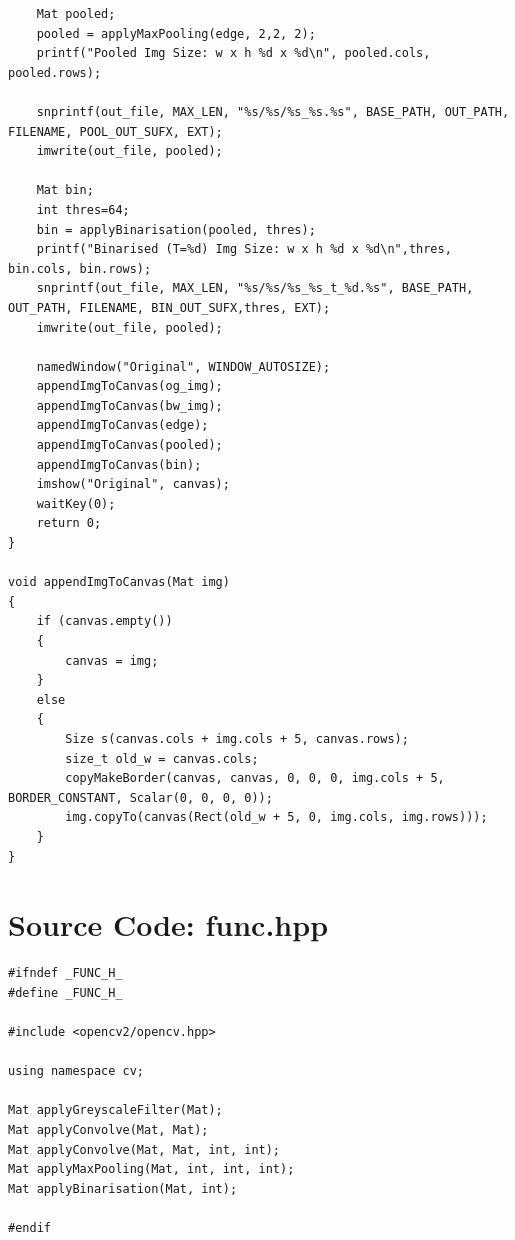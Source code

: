 \documentclass[12pt,a4paper]{report}
\begin{document}
\begin{lstlisting}
    Mat pooled;
    pooled = applyMaxPooling(edge, 2,2, 2);
    printf("Pooled Img Size: w x h %d x %d\n", pooled.cols, pooled.rows);

    snprintf(out_file, MAX_LEN, "%s/%s/%s_%s.%s", BASE_PATH, OUT_PATH, FILENAME, POOL_OUT_SUFX, EXT);
    imwrite(out_file, pooled);

    Mat bin;
    int thres=64;
    bin = applyBinarisation(pooled, thres);
    printf("Binarised (T=%d) Img Size: w x h %d x %d\n",thres, bin.cols, bin.rows);
    snprintf(out_file, MAX_LEN, "%s/%s/%s_%s_t_%d.%s", BASE_PATH, OUT_PATH, FILENAME, BIN_OUT_SUFX,thres, EXT);
    imwrite(out_file, pooled);

    namedWindow("Original", WINDOW_AUTOSIZE);
    appendImgToCanvas(og_img);
    appendImgToCanvas(bw_img);
    appendImgToCanvas(edge);
    appendImgToCanvas(pooled);
    appendImgToCanvas(bin);
    imshow("Original", canvas);
    waitKey(0);
    return 0;
}

void appendImgToCanvas(Mat img)
{
    if (canvas.empty())
    {
        canvas = img;
    }
    else
    {
        Size s(canvas.cols + img.cols + 5, canvas.rows);
        size_t old_w = canvas.cols;
        copyMakeBorder(canvas, canvas, 0, 0, 0, img.cols + 5, BORDER_CONSTANT, Scalar(0, 0, 0, 0));
        img.copyTo(canvas(Rect(old_w + 5, 0, img.cols, img.rows)));
    }
}
\end{lstlisting}

\chapter{Source Code: func.hpp}
\begin{lstlisting}
#ifndef _FUNC_H_
#define _FUNC_H_

#include <opencv2/opencv.hpp>

using namespace cv;

Mat applyGreyscaleFilter(Mat);
Mat applyConvolve(Mat, Mat);
Mat applyConvolve(Mat, Mat, int, int);
Mat applyMaxPooling(Mat, int, int, int);
Mat applyBinarisation(Mat, int);

#endif
\end{lstlisting}
\end{document}
